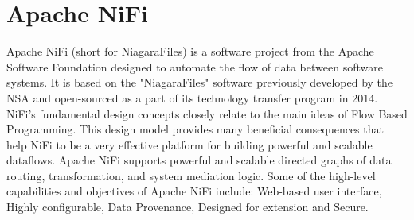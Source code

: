 \section{Apache NiFi}
Apache NiFi (short for NiagaraFiles) is a software project from the Apache
Software Foundation designed to automate the flow of data between software
systems. It is based on the "NiagaraFiles" software previously developed by
the NSA and open-sourced as a part of its technology transfer program in 2014.
\cite{nifi-wiki} NiFi's fundamental design concepts closely relate to the main
ideas of Flow Based Programming. This design model provides many beneficial
consequences that help NiFi to be a very effective platform for building
powerful and scalable dataflows. Apache NiFi supports powerful and scalable
directed graphs of data routing, transformation, and system mediation
logic.\cite{ nifi-overview} Some of the high-level capabilities and objectives
of Apache NiFi include: Web-based user interface, Highly configurable, Data
Provenance, Designed for extension and Secure. \cite{nifi-web}
 

